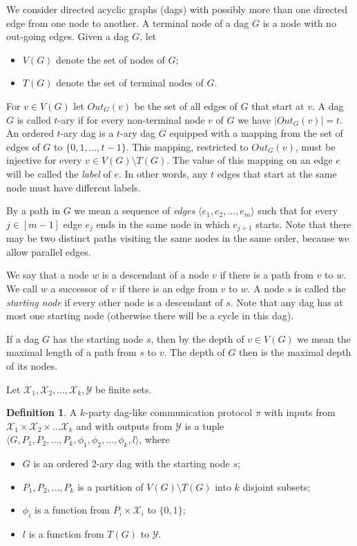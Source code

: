 \documentclass[11pt]{article}
\numberwithin{equation}{section}
\theoremstyle{definition}
\newtheorem{definition}[theorem]{Definition}
\theoremstyle{plain}
\begin{document}
We consider directed acyclic graphs (dags) with possibly more than one directed edge from one node to another.
%
%
%
%
A terminal node of a dag $G$ is a node with no out-going edges.
Given a dag $G$, let
\begin{itemize}
\item $V(G)$ denote the set of nodes of $G$;
\item $T(G)$ denote the  set of terminal nodes of $G$. 
\end{itemize}
For $v\in V(G)$ let $Out_G(v)$ be the set of all edges of $G$ that start at $v$.
A dag $G$ is called $t$-ary if for every non-terminal node $v$ of $G$ we have $|Out_G(v)| = t$. An ordered $t$-ary dag is a $t$-ary dag $G$ equipped with a mapping from the set of edges of $G$ to $\{0, 1, \ldots, t - 1\}$. This mapping, restricted to $Out_G(v)$, must be injective for every $v\in V(G)\setminus T(G)$. The value of this mapping on an edge $e$ will be called the \emph{label} of $e$. In other words, any $t$ edges that start at the same node must have different labels.


By a path in $G$ we mean a sequence of \emph{edges} $\langle e_1, e_2, \ldots, e_m\rangle$ such that for every $j\in[m - 1]$ edge $e_j$ ends in the same node in which $e_{j + 1}$ starts.  Note that there may be two distinct paths visiting the same nodes in the same order, because we allow parallel edges.

We say that a node $w$ is a descendant of a node $v$ if there is a path from $v$ to $w$. We call $w$ a successor of $v$ if there is an edge from $v$ to $w$. A node $s$ is called the \emph{starting node} if every other node is a descendant of $s$. Note that any dag has at most one starting node (otherwise there will be a cycle in this dag).

If a dag $G$ has the starting node $s$, then by the depth of $v\in V(G)$ we mean the maximal length of a path from $s$ to $v$. The depth of $G$ then is the maximal depth of its nodes. 

%
%
%
%
Let $\mathcal{X}_1, \mathcal{X}_2, \ldots, \mathcal{X}_k, \mathcal{Y}$
be finite sets.  %

\begin{definition}
\label{dag_like_protocol}
A $k$-party dag-like communication protocol $\pi$ with inputs from $\mathcal{X}_1 \times \mathcal{X}_2 \times \ldots \mathcal{X}_k$ and with outputs from $\mathcal{Y}$ is a tuple $\langle G, P_1, P_2, \ldots, P_k, \phi_1, \phi_2, \ldots, \phi_k, l\rangle$, where
\begin{itemize}
\item $G$ is an ordered $2$-ary dag with the starting node $s$;
\item $P_1, P_2, \ldots, P_k$ is a partition of $V(G)\setminus T(G)$ into $k$ disjoint subsets;
\item $\phi_i$ is a function from $P_i\times \mathcal{X}_i$ to $\{0, 1\}$;
\item $l$ is a function from $T(G)$ to $\mathcal{Y}$.
\end{itemize}
\end{definition}
\end{document}
